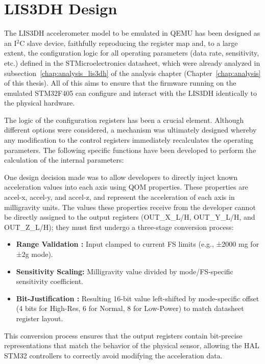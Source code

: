 \section{LIS3DH Design}
\label{chap:design_lis3dh}

The LIS3DH accelerometer model to be emulated in QEMU has been designed as an I$^2$C slave device, faithfully reproducing the register map and, to a large extent, the configuration logic for all operating parameters (data rate, sensitivity, etc.) defined in the STMicroelectronics datasheet, which were already analyzed in subsection~\ref{chap:analysis_lis3dh} of the analysis chapter (Chapter~\ref{chap:analysis} of this thesis). All of this aims to ensure that the firmware running on the emulated STM32F405 can configure and interact with the LIS3DH identically to the physical hardware.

The logic of the configuration registers has been a crucial element. Although different options were considered, a mechanism was ultimately designed whereby any modification to the control registers immediately recalculates the operating parameters. The following specific functions have been developed to perform the calculation of the internal parameters:



One design decision made was to allow developers to directly inject known acceleration values into each axis using QOM properties. These properties are accel-x, accel-y, and accel-z, and represent the acceleration of each axis in milligravity units. The values these properties receive from the developer cannot be directly assigned to the output registers (OUT\_X\_L/H, OUT\_Y\_L/H, and OUT\_Z\_L/H); they must first undergo a three-stage conversion process:

\begin{itemize}
    \item \textbf{Range Validation   :} Input clamped to current FS limits (e.g., ±2000 mg for ±2g mode).
    \item \textbf{Sensitivity Scaling:} Milligravity value divided by mode/FS-specific sensitivity coefficient.
    \item \textbf{Bit-Justification  :} Resulting 16-bit value left-shifted by mode-specific offset (4 bits for High-Res, 6 for Normal, 8 for Low-Power) to match datasheet register layout.
\end{itemize}


This conversion process ensures that the output registers contain bit-precise representations that match the behavior of the physical sensor, allowing the HAL STM32 controllers to correctly avoid modifying the acceleration data.